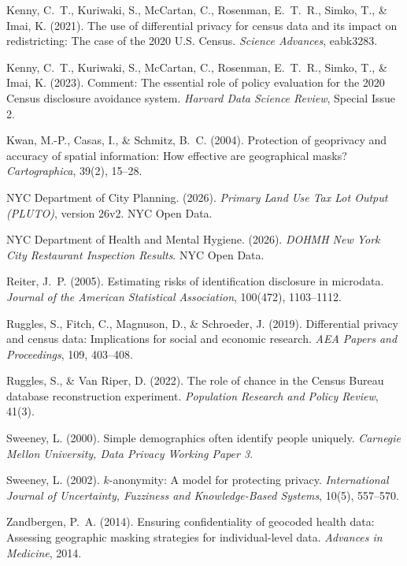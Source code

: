 \documentclass[11pt]{article}
\begin{document}
\noindent Kenny, C.~T., Kuriwaki, S., McCartan, C., Rosenman, E.~T.~R., Simko, T., \& Imai, K. (2021). The use of differential privacy for census data and its impact on redistricting: The case of the 2020 U.S. Census. \textit{Science Advances}, eabk3283.

\noindent Kenny, C.~T., Kuriwaki, S., McCartan, C., Rosenman, E.~T.~R., Simko, T., \& Imai, K. (2023). Comment: The essential role of policy evaluation for the 2020 Census disclosure avoidance system. \textit{Harvard Data Science Review}, Special Issue 2.

\noindent Kwan, M.-P., Casas, I., \& Schmitz, B.~C. (2004). Protection of geoprivacy and accuracy of spatial information: How effective are geographical masks? \textit{Cartographica}, 39(2), 15--28.

\noindent NYC Department of City Planning. (2026). \textit{Primary Land Use Tax Lot Output (PLUTO)}, version 26v2. NYC Open Data.

\noindent NYC Department of Health and Mental Hygiene. (2026). \textit{DOHMH New York City Restaurant Inspection Results}. NYC Open Data.

\noindent Reiter, J.~P. (2005). Estimating risks of identification disclosure in microdata. \textit{Journal of the American Statistical Association}, 100(472), 1103--1112.

\noindent Ruggles, S., Fitch, C., Magnuson, D., \& Schroeder, J. (2019). Differential privacy and census data: Implications for social and economic research. \textit{AEA Papers and Proceedings}, 109, 403--408.

\noindent Ruggles, S., \& Van Riper, D. (2022). The role of chance in the Census Bureau database reconstruction experiment. \textit{Population Research and Policy Review}, 41(3).

\noindent Sweeney, L. (2000). Simple demographics often identify people uniquely. \textit{Carnegie Mellon University, Data Privacy Working Paper 3}.

\noindent Sweeney, L. (2002). $k$-anonymity: A model for protecting privacy. \textit{International Journal of Uncertainty, Fuzziness and Knowledge-Based Systems}, 10(5), 557--570.

\noindent Zandbergen, P.~A. (2014). Ensuring confidentiality of geocoded health data: Assessing geographic masking strategies for individual-level data. \textit{Advances in Medicine}, 2014.
\end{document}
